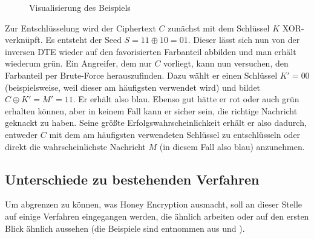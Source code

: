 \begin{figure}[!h]
\center
{}
\caption{Visualisierung des Beispiels}
\label{fig:Beispiel}
\end{figure}

Zur Entschlüsselung wird der Ciphertext \(C\) zunächst mit dem Schlüssel \(K\) XOR-verknüpft. Es entsteht der Seed \(S = 11 \oplus 10 = 01\). Dieser lässt sich nun von der inversen DTE wieder auf den favorisierten Farbanteil abbilden und man erhält wiederum grün. Ein Angreifer, dem nur \(C\) vorliegt, kann nun versuchen, den Farbanteil per Brute-Force herauszufinden. Dazu wählt er einen Schlüssel \(K'=00\) (beispielsweise, weil dieser am häufigsten verwendet wird) und bildet \(C \oplus K' = M' = 11\). Er erhält also blau. Ebenso gut hätte er rot oder auch grün erhalten können, aber in keinem Fall kann er sicher sein, die richtige Nachricht geknackt zu haben. Seine größte Erfolgswahrscheinlichkeit erhält er also dadurch, entweder \(C\) mit dem am häufigsten verwendeten Schlüssel zu entschlüsseln oder direkt die wahrscheinlichste Nachricht \(M\) (in diesem Fall also blau) anzunehmen.

\subsection{Unterschiede zu bestehenden Verfahren}

Um abgrenzen zu können, was Honey Encryption ausmacht, soll an dieser Stelle auf einige Verfahren eingegangen werden, die ähnlich arbeiten oder auf den ersten Blick ähnlich aussehen (die Beispiele sind entnommen aus \cite{EURO2014} und \cite{IEEE2014}).

